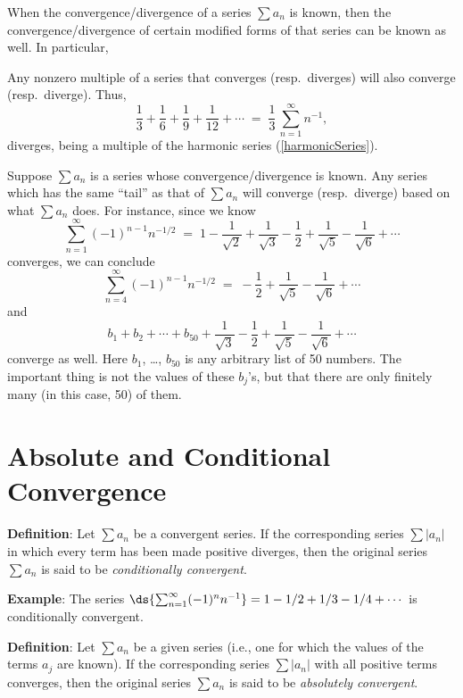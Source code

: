 \documentclass[12pt,fleqn]{article}
\begin{document}
\item
  When the convergence/divergence of a series $\sum a_n$ is known,
  then the convergence/divergence of certain modified forms of that
  series can be known as well.  In particular,
  \bi
  \item
	Any nonzero multiple of a series that converges (resp.~diverges)
	will also converge (resp.~diverge).  Thus,
	$$ \frac{1}{3} + \frac{1}{6} + \frac{1}{9} + \frac{1}{12} + \cdots
	  \;=\; \frac{1}{3}\,\sum_{n=1}^\infty n^{-1}, $$
	diverges, being a multiple of the harmonic series (\ref{harmonicSeries}).
  \item
	Suppose $\sum a_n$ is a series whose convergence/divergence is known.
	Any series which has the same ``tail'' as that of $\sum a_n$
	will converge (resp.~diverge) based on what $\sum a_n$ does.  For
	instance, since we know
	$$ \sum_{n=1}^\infty (-1)^{n-1} n^{-1/2} \;=\; 1 - \frac{1}{\sqrt 2}
	  + \frac{1}{\sqrt 3} - \frac{1}{2} + \frac{1}{\sqrt 5}
	  - \frac{1}{\sqrt 6} + \cdots $$
	converges, we can conclude
	$$ \sum_{n=4}^\infty (-1)^{n-1} n^{-1/2} \;=\; - \frac{1}{2}
	  + \frac{1}{\sqrt 5} - \frac{1}{\sqrt 6} + \cdots $$
	and
	$$ b_1 + b_2 + \cdots + b_{50} + \frac{1}{\sqrt 3} - \frac{1}{2}
	  + \frac{1}{\sqrt 5} - \frac{1}{\sqrt 6} + \cdots $$
	converge as well.  Here $b_1$, \ldots, $b_{50}$ is any arbitrary
	list of 50 numbers.  The important thing is not the values of
	these $b_j$'s, but that there are only finitely many (in this
	case, 50) of them.
  \ei
\ei

\section*{Absolute and Conditional Convergence}

\ni
{\bf Definition}: \; Let $\sum a_n$ be a convergent series.  If the
corresponding series $\sum |a_n|$ in which every term has been made
positive diverges, then the original series $\sum a_n$ is said to be
{\em conditionally convergent}.

\vspace{0.15in}
\ni
{\bf Example}: \; The series
$\ds{\sum_{n=1}^\infty (-1)^n n^{-1}} = 1 - 1/2 + 1/3 - 1/4 + \cdots$
is conditionally convergent.

\vspace{0.15in}
\ni
{\bf Definition}: Let $\sum a_n$ be a given series (i.e., one for which
the values of the terms $a_j$ are known).  If the corresponding
series $\sum |a_n|$ with all positive terms converges, then the original
series $\sum a_n$ is said to be {\em absolutely convergent}.
\end{document}
